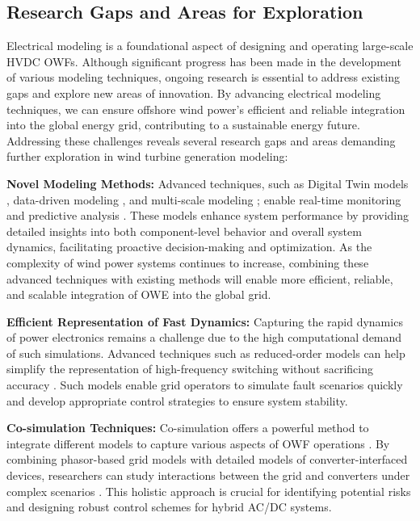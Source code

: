 \documentclass{ieeeaccess}
\begin{document}
\subsection{\textbf{Research Gaps and Areas for Exploration}}
Electrical modeling is a foundational aspect of designing and operating large-scale HVDC OWFs. Although significant progress has been made in the development of various modeling techniques, ongoing research is essential to address existing gaps and explore new areas of innovation. By advancing electrical modeling techniques, we can ensure offshore wind power's efficient and reliable integration into the global energy grid, contributing to a sustainable energy future.
Addressing these challenges reveals several research gaps and areas demanding further exploration in wind turbine generation modeling:

\textbf{Novel Modeling Methods:} Advanced techniques, such as Digital Twin models \cite{haghshenas2023predictive}, data-driven modeling \cite{wang2021mixed}, and multi-scale modeling \cite{marinescu2022dynamic}; enable real-time monitoring and predictive analysis \cite{nguyen2023real}. These models enhance system performance by providing detailed insights into both component-level behavior and overall system dynamics, facilitating proactive decision-making and optimization. As the complexity of wind power systems continues to increase, combining these advanced techniques with existing methods will enable more efficient, reliable, and scalable integration of OWE into the global grid.

\textbf{Efficient Representation of Fast Dynamics:} Capturing the rapid dynamics of power electronics remains a challenge due to the high computational demand of such simulations. Advanced techniques such as reduced-order models can help simplify the representation of high-frequency switching without sacrificing accuracy \cite{subedi2021review}. Such models enable grid operators to simulate fault scenarios quickly and develop appropriate control strategies to ensure system stability. %

\textbf{Co-simulation Techniques:} Co-simulation offers a powerful method to integrate different models to capture various aspects of OWF operations \cite{da2023modeling}. By combining phasor-based grid models with detailed models of converter-interfaced devices, researchers can study interactions between the grid and converters under complex scenarios \cite{raab2022hybrid}. This holistic approach is crucial for identifying potential risks and designing robust control schemes for hybrid AC/DC systems.%
\end{document}
